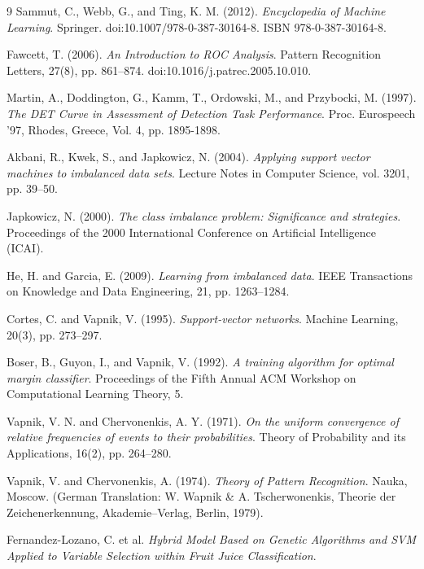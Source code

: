 \begin{thebibliography}{9}
Sammut, C., Webb, G., and Ting, K. M. (2012).
\textit{Encyclopedia of Machine Learning}.
Springer. doi:10.1007/978-0-387-30164-8. ISBN 978-0-387-30164-8.

Fawcett, T. (2006).
\textit{An Introduction to ROC Analysis}.
Pattern Recognition Letters, 27(8), pp. 861–874. doi:10.1016/j.patrec.2005.10.010.

Martin, A., Doddington, G., Kamm, T., Ordowski, M., and Przybocki, M. (1997).
\textit{The DET Curve in Assessment of Detection Task Performance}.
Proc. Eurospeech '97, Rhodes, Greece, Vol. 4, pp. 1895-1898.

Akbani, R., Kwek, S., and Japkowicz, N. (2004).
\textit{Applying support vector machines to imbalanced data sets}.
Lecture Notes in Computer Science, vol. 3201, pp. 39–50.

Japkowicz, N. (2000).
\textit{The class imbalance problem: Significance and strategies}.
Proceedings of the 2000 International Conference on Artificial Intelligence (ICAI).

He, H. and Garcia, E. (2009).
\textit{Learning from imbalanced data}.
IEEE Transactions on Knowledge and Data Engineering, 21, pp. 1263–1284.

Cortes, C. and Vapnik, V. (1995).
\textit{Support-vector networks}.
Machine Learning, 20(3), pp. 273–297.

Boser, B., Guyon, I., and Vapnik, V. (1992).
\textit{A training algorithm for optimal margin classifier}.
Proceedings of the Fifth Annual ACM Workshop on Computational Learning Theory, 5.

Vapnik, V. N. and Chervonenkis, A. Y. (1971).
\textit{On the uniform convergence of relative frequencies of events to their probabilities}.
Theory of Probability and its Applications, 16(2), pp. 264–280.

Vapnik, V. and Chervonenkis, A. (1974).
\textit{Theory of Pattern Recognition}.
Nauka, Moscow. (German Translation: W. Wapnik \& A. Tscherwonenkis, Theorie der Zeichenerkennung, Akademie–Verlag, Berlin, 1979).

Fernandez-Lozano, C. et al.
\textit{Hybrid Model Based on Genetic Algorithms and SVM Applied to Variable Selection within Fruit Juice Classification}.


\end{thebibliography}
